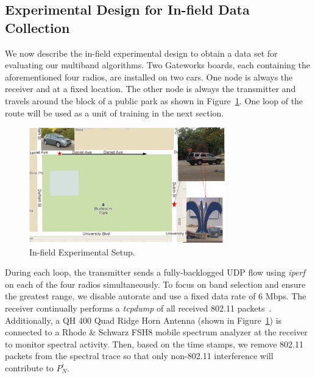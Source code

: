\subsection{Experimental Design for In-field Data Collection}
\label{subsec:insitu}
We now describe the in-field experimental design to obtain a data set for
evaluating our multiband algorithms. Two Gateworks boards, each containing
the aforementioned four radios, are installed on two cars.  One node is always
the receiver and at a fixed location. The other node is always the 
transmitter and travels 
around the block of a public park as shown in Figure~\ref{fig:infield}.
One loop of the route will be used as a unit of training in the next section.

\begin{figure} [h]
\centering
\includegraphics[width=85mm]{figures/infield}
\vspace{-0.1in}
\caption{In-field Experimental Setup.}
\label{fig:infield}
\vspace{-0.1in}
\end{figure}

During each loop, the transmitter sends a fully-backlogged UDP flow
using {\it iperf} on each of the four radios simultaneously.  To
focus on band selection and ensure the greatest range, we disable autorate and use a fixed data rate
of 6 Mbps. The receiver continually performs a {\it tcpdump} of all
received 802.11 packets~\cite{jacobson1989tcpdump}. Additionally, a
QH 400 Quad Ridge Horn Antenna (shown in Figure~\ref{fig:infield}) is 
connected to a Rhode \& Schwarz FSH8 mobile spectrum analyzer at the 
receiver to monitor spectral activity. Then, based on the 
time stamps, we remove 802.11 packets from the spectral trace 
so that only non-802.11 interference will contribute to $P_N^i$.

